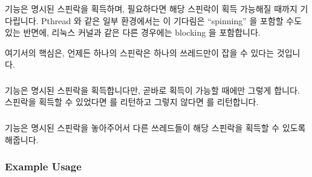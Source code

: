 \subsubsection{}

 기능은 명시된 스핀락을 획득하며, 필요하다면 해당 스핀락이 획득
가능해질 때까지 기다립니다.
Pthread 와 같은 일부 환경에서는 이 기다림은 ``spinning'' 을 포함할 수도 있는
반면에, 리눅스 커널과 같은 다른 경우에는 blocking 을 포함합니다.

여기서의 핵심은, 언제든 하나의 스핀락은 하나의 쓰레드만이 잡을 수 있다는
것입니다.

\subsubsection{}

 기능은 명시된 스핀락을 획득합니다만, 곧바로 획득이 가능할
때에만 그렇게 합니다.
스핀락을 획득할 수 있었다면  를 리턴하고 그렇지 않다면  를
리턴합니다.

\subsubsection{}

 기능은 명시된 스핀락을 놓아주어서 다른 쓰레드들이 해당
스핀락을 획득할 수 있도록 해줍니다.

\subsubsection{Example Usage}

